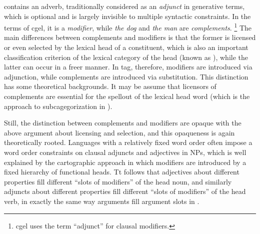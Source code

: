 \documentclass[../main.tex]{subfiles}
\begin{document}
 contains an adverb, 
traditionally considered as an \emph{adjunct} in generative terms, 
which is optional and is largely invisible to multiple syntactic constraints. 
In the terms of \ac{cgel}, it is a \emph{modifier}, 
while \emph{the dog} and \emph{the man} are \emph{complements}.%
\footnote{\ac{cgel} uses the term ``adjunct'' for clausal modifiers.}
The main differences between complements and modifiers 
is that the former is licensed or even selected by the lexical head of a constituent, 
which is also an important classification criterion 
of the lexical category of the head (known as ),
while the latter can occur in a freer manner. 
In \ac{tag}, therefore, modifiers are introduced via adjunction, 
while complements are introduced via substitution.
This distinction has some theoretical backgrounds.
It may be assume that licensors of complements are essential for the spellout of the lexical head word
(which is the approach to subcagegorization in \citet{siddiqi2009syntax}).

Still, the distinction between complements and modifiers are opaque with 
the above argument about licensing and selection, 
and this opaqueness is again theoretically rooted. 
Languages with a relatively fixed word order often impose 
a word order constraints on clausal adjuncts and adjectives in NPs, 
which is well explained by the cartographic approach in which modifiers 
are introduced by a fixed hierarchy of functional heads. 
Tt follows that adjectives about different properties fill different ``slots of modifiers'' of the head noun, 
and similarly adjuncts about different properties fill different ``slots of modifiers'' of the head verb, 
in exactly the same way arguments fill argument slots in . 
\end{document}
